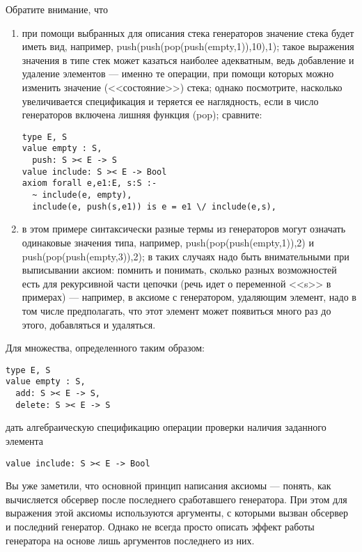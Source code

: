 Обратите внимание, что
\begin{enumerate}
\item при помощи выбранных для описания стека генераторов значение стека будет иметь вид, например, push(push(pop(push(empty,1)),10),1); такое выражения значения в типе стек может казаться наиболее адекватным, ведь добавление и удаление элементов --- именно те операции, при помощи которых можно изменить значение (<<состояние>>) стека; однако посмотрите, насколько увеличивается спецификация и теряется ее наглядность, если в число генераторов включена лишняя функция (pop); сравните:
\begin{lstlisting}
type E, S
value empty : S,
  push: S >< E -> S
value include: S >< E -> Bool
axiom forall e,e1:E, s:S :-
  ~ include(e, empty),
  include(e, push(s,e1)) is e = e1 \/ include(e,s),
\end{lstlisting}

\item в этом примере синтаксически разные термы из генераторов могут означать одинаковые значения типа, например, push(pop(push(empty,1)),2) и push(pop(push(empty,3)),2); в таких случаях надо быть внимательными при выписывании аксиом: помнить и понимать, сколько разных возможностей есть для рекурсивной части цепочки (речь идет о переменной <<s>> в примерах) --- например, в аксиоме с генератором, удаляющим элемент, надо в том числе предполагать, что этот элемент может появиться много раз до этого, добавляться и удаляться.
\end{enumerate}



\z Для множества, определенного таким образом:
\begin{lstlisting}
type E, S
value empty : S,
  add: S >< E -> S,
  delete: S >< E -> S
\end{lstlisting}
дать алгебраическую спецификацию операции проверки наличия заданного элемента
\begin{lstlisting}
value include: S >< E -> Bool
\end{lstlisting}


Вы уже заметили, что основной принцип написания аксиомы --- понять, как вычисляется обсервер после последнего сработавшего генератора. При этом для выражения этой аксиомы используются аргументы, с которыми вызван обсервер и последний генератор. Однако не всегда просто описать эффект работы генератора на основе лишь аргументов последнего из них.

